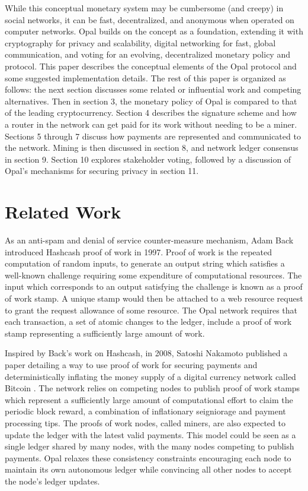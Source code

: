 \documentclass[10pt,twocolumn]{article}
\begin{document}
While this conceptual monetary system may be cumbersome (and creepy) in social networks, it can be fast, decentralized, and anonymous when operated on computer networks.  Opal builds on the concept as a foundation, extending it with cryptography for privacy and scalability, digital networking for fast, global communication, and voting for an evolving, decentralized monetary policy and protocol.  This paper describes the conceptual elements of the Opal protocol and some suggested implementation details.  The rest of this paper is organized as follows: the next section discusses some related or influential work and competing alternatives.  Then in section 3, the monetary policy of Opal is compared to that of the leading cryptocurrency.  Section 4 describes the signature scheme and how a router in the network can get paid for its work without needing to be a miner.  Sections 5 through 7 discuss how payments are represented and communicated to the network.  Mining is then discussed in section 8, and network ledger consensus in section 9.  Section 10 explores stakeholder voting, followed by a discussion of Opal's mechanisms for securing privacy in section 11.

\section{Related Work}
As an anti-spam and denial of service counter-measure mechanism, Adam Back introduced Hashcash \cite{back97} proof of work in 1997.  Proof of work is the repeated computation of random inputs, to generate an output string which satisfies a well-known challenge requiring some expenditure of computational resources.  The input which corresponds to an output satisfying the challenge is known as a proof of work stamp.  A unique stamp would then be attached to a web resource request to grant the request allowance of some resource.  The Opal network requires that each transaction, a set of atomic changes to the ledger, include a proof of work stamp representing a sufficiently large amount of work.

Inspired by Back's work on Hashcash, in 2008, Satoshi Nakamoto published a paper detailing a way to use proof of work for securing payments and deterministically inflating the money supply of a digital currency network called Bitcoin \cite{naka08}.  The network relies on competing nodes to publish proof of work stamps which represent a sufficiently large amount of computational effort to claim the periodic block reward, a combination of inflationary seigniorage and payment processing tips.  The proofs of work nodes, called miners, are also expected to update the ledger with the latest valid payments.  This model could be seen as a single ledger shared by many nodes, with the many nodes competing to publish payments.  Opal relaxes these consistency constraints encouraging each node to maintain its own autonomous ledger while convincing all other nodes to accept the node's ledger updates.
\end{document}
